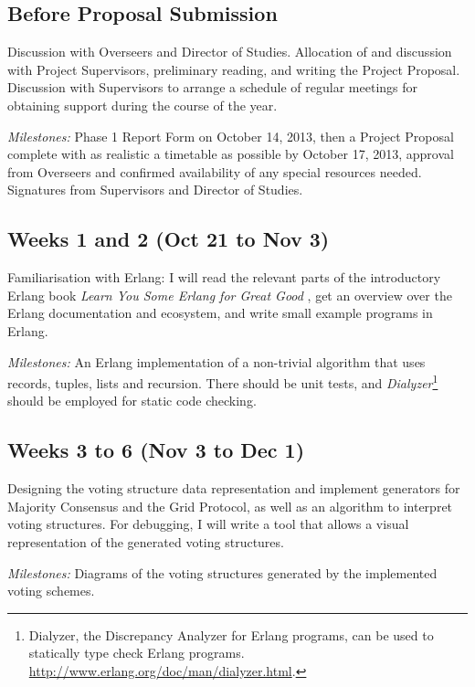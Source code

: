 \documentclass[12pt,chapterprefix=true,toc=bibliography,numbers=noendperiod,
               footnotes=multiple,twoside]{scrreprt}
\begin{document}
\subsection*{Before Proposal Submission%
  \label{before-proposals-submission}%
}

Discussion with Overseers and Director of Studies. Allocation of and discussion with Project Supervisors, preliminary reading, and writing the Project Proposal. Discussion with Supervisors to arrange a schedule of regular meetings for obtaining support during the course of the year.

\emph{Milestones:} Phase 1 Report Form on October 14, 2013, then a Project Proposal complete with as realistic a timetable as possible by October 17, 2013, approval from Overseers and confirmed availability of any special resources needed. Signatures from Supervisors and Director of Studies.


\subsection*{Weeks 1 and 2 (Oct 21 to Nov 3)%
  \label{weeks-1-and-2-oct-21-to-nov-3}%
}

Familiarisation with Erlang: I will read the relevant parts of the introductory Erlang book \emph{Learn You Some Erlang for Great Good} \autocite{lysefgg}, get an overview over the Erlang documentation and ecosystem, and write small example programs in Erlang.

\emph{Milestones:} An Erlang implementation of a non-trivial algorithm that uses records, tuples, lists and recursion. There should be unit tests, and \emph{Dialyzer}\footnote{Dialyzer, the Discrepancy Analyzer for Erlang programs, can be used to statically type check Erlang programs. \url{http://www.erlang.org/doc/man/dialyzer.html}.} should be employed for static code checking.


\subsection*{Weeks 3 to 6 (Nov 3 to Dec 1)%
  \label{weeks-3-to-6-nov-3-to-dec-1}%
}

Designing the voting structure data representation and implement generators for Majority Consensus and the Grid Protocol, as well as an algorithm to interpret voting structures. For debugging, I will write a tool that allows a visual representation of the generated voting structures.

\emph{Milestones:} Diagrams of the voting structures generated by the implemented voting schemes.
\end{document}
